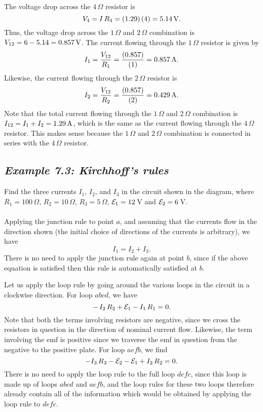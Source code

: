 The voltage drop across the $4\,\Omega$ resistor is
$$
V_4 = I\,R_4 = (1.29)\,(4) =5.14\,{\rm V}.
$$
Thus, the voltage  drop across the $1\,\Omega$  and $2\,\Omega$ combination is
$V_{12} = 6-5.14 = 0.857\,{\rm V}$. The current flowing through the $1\,\Omega$ 
resistor is given by
$$
I_1 = \frac{V_{12}}{R_1} = \frac{(0.857)}{(1)}= 0.857\,{\rm A}.
$$
Likewise, the current flowing through the $2\,\Omega$ 
resistor is 
$$
I_2 = \frac{V_{12}}{R_2} = \frac{(0.857)}{(2)}= 0.429\,{\rm A}.
$$
Note that the total current flowing through the $1\,\Omega$  and $2\,\Omega$ combination is
$I_{12} = I_1 + I_2 = 1.29\,{\rm A}$, which is the same as the current flowing through
the $4\,\Omega$ resistor. This makes sense because the  $1\,\Omega$  and $2\,\Omega$ combination
is connected in series with the $4\,\Omega$ resistor.

\subsection*{\em Example 7.3: Kirchhoff's rules}
Find the three currents $I_1$, $I_2$, and $I_3$ in the circuit shown in the diagram,
where $R_1= 100\,\Omega$, $R_2=10\,\Omega$, $R_3=5\,\Omega$, ${\cal E}_1=12$\,V
and ${\cal E}_2=6$\,V.\\
~\\
 Applying the junction rule to point $a$, and assuming that
the currents flow in the direction shown (the initial choice of 
directions of the currents is arbitrary), we have
$$
I_1 = I_2 + I_3.
$$
There is no need to apply the junction rule again at point $b$, since if the
above equation is satisfied then this rule is automatically satisfied at $b$. 

\begin{figure*}[h]
\epsfysize=3in
\centerline{}
\end{figure*}


Let us apply the loop rule by going around the various loops in the circuit
in a clockwise direction. For loop $abcd$, we have
$$
-\,I_2\,R_2+{\cal E}_1 - I_1\,R_1=0.
$$
Note that both the terms involving resistors are negative, since we cross
the resistors in question in the direction of nominal current flow.
Likewise, the term involving the emf is  positive since we traverse      the
emf in question from the negative to the positive plate. For loop
$aefb$, we find
$$
-I_3\,R_3 -{\cal E}_2 -{\cal E}_1 + I_2\,R_2  = 0.
$$
There is no need to apply the loop rule to the full loop $defc$, since
this loop is made up of loops $abcd$ and $aefb$, and the loop rules for these two
loops therefore already contain all of the information 
which would be obtained by applying the
loop rule to $defc$. 


